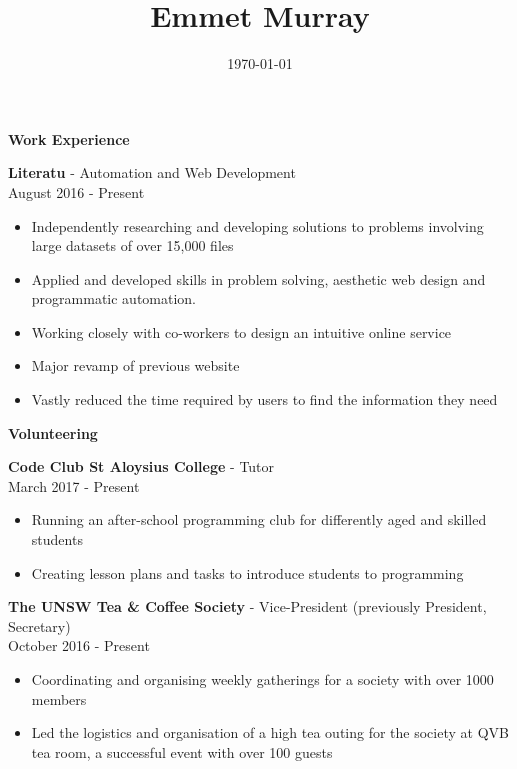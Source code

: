 \documentclass{article}
\title{\textbf{Emmet Murray}}
\date{\today}
\newcommand{\minititle}[1]{\begin{center}\textbf{#1} \end{center} \vspace{0.2cm}}
\newcommand{\resumeEntry}[3]{{\large \textbf{#1} - #2} \\ \small{#3}}
\begin{document}
 

\begin{minipage}[t]{0.6\linewidth}   
    \maketitle
    {
        \minititle{Work Experience}
        \resumeEntry{Literatu}{Automation and Web Development}{August 2016 - Present}
        \begin{itemize}
            \setlength\itemsep{0.05cm}
            \item Independently researching and developing solutions to problems involving large datasets of over 15,000 files
            \item Applied and developed skills in problem solving, aesthetic web design and programmatic automation.
            \item Working closely with co-workers to design an intuitive online service
            \item Major revamp of previous website
            \item Vastly reduced the time required by users to find the information they need
        \end{itemize}
    }
    {
        \vspace{0.2cm}
        \minititle{Volunteering}
        \resumeEntry{Code Club St Aloysius College}{Tutor}{March 2017 - Present}
        \begin{itemize}
            \setlength\itemsep{0.05cm}
            \item Running an after-school programming club for differently aged and skilled students
            \item Creating lesson plans and tasks to introduce students to programming
        \end{itemize}
        \vspace{0.4cm}
        \resumeEntry{The UNSW Tea \& Coffee Society}{Vice-President (previously President, Secretary)}{October 2016 - Present}
        \begin{itemize}
            \setlength\itemsep{0.05cm}
            \item Coordinating and organising weekly gatherings for a society with over 1000 members 
            \item Led the logistics and organisation of a high tea outing for the society at QVB tea room, a successful event with over 100 guests
        \end{itemize}
}
\end{minipage}
\end{document}

